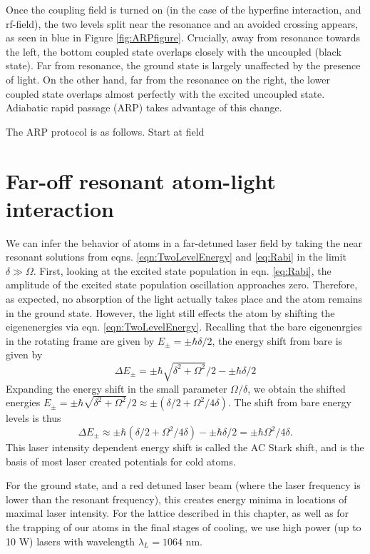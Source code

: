 Once the coupling field is turned on (in the case of the hyperfine interaction, and rf-field), the two levels split near the resonance and an avoided crossing appears, as seen in blue in Figure \ref{fig:ARPfigure}. Crucially, away from resonance towards the left, the bottom coupled state overlaps closely with the uncoupled (black state). Far from resonance, the ground state is largely unaffected by the presence of light. On the other hand, far from the resonance on the right, the lower coupled state overlaps almost perfectly with the excited uncoupled state. Adiabatic rapid passage (ARP) takes advantage of this change.

The ARP protocol is as follows. Start at field

\section{Far-off resonant atom-light interaction}

	We can infer the behavior of atoms in a far-detuned laser field by taking the near resonant solutions from eqns. \ref{eqn:TwoLevelEnergy} and \ref{eq:Rabi} in the limit $\delta \gg \Omega$. First, looking at the excited state population in eqn. \ref{eq:Rabi}, the amplitude of the excited state population oscillation approaches zero. Therefore, as expected, no absorption of the light actually takes place and the atom remains in the ground state. 
	However, the light still effects the atom by shifting the eigenenergies via eqn. \ref{eqn:TwoLevelEnergy}. Recalling that the bare eigenenrgies in the rotating frame are given by $E_{\pm}=\pm \hbar\delta/2$, the energy shift from bare is given by
\begin{equation}
\Delta E_{\pm} = \pm\hbar\sqrt{\delta^2+\Omega^2}/2 -\pm \hbar\delta/2
\end{equation}
Expanding the energy shift in the small parameter $\Omega/\delta$, we obtain the shifted energies $E_{\pm} = \pm \hbar \sqrt{\delta^2 + \Omega^2}/2 \approx \pm (\delta/2 + \Omega^2/4\delta)$. The shift from bare energy levels is thus 
\begin{equation}
\Delta E_{\pm} \approx \pm \hbar(\delta/2 + \Omega^2/4\delta)-\pm \hbar\delta/2 = \pm \hbar \Omega^2/4\delta.
\end{equation}
This laser intensity dependent energy shift is called the AC Stark shift, and is the basis of most laser created potentials for cold atoms. 
	
For the ground state, and a red detuned laser beam (where the laser frequency is lower than the resonant frequency), this creates energy minima in locations of maximal laser intensity. For the lattice described in this chapter, as well as for the trapping of our atoms in the final stages of cooling, we use high power (up to 10 W) lasers with wavelength $\lambda_L = 1064 $ nm. 

